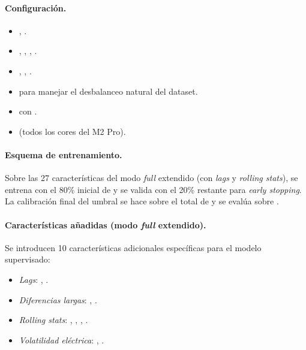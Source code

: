 \paragraph{Configuración.}
\begin{itemize}[leftmargin=*,topsep=0pt]
  \item {}, .
  \item {}, , , .
  \item {}, , .
  \item {} para manejar el desbalanceo natural del dataset.
  \item {} con .
  \item {} (todos los cores del M2 Pro).
\end{itemize}

\paragraph{Esquema de entrenamiento.} Sobre las 27 características del modo \emph{full} extendido (con \emph{lags} y \emph{rolling stats}), se entrena con el 80\% inicial de  y se valida con el 20\% restante para \emph{early stopping}. La calibración final del umbral se hace sobre el total de  y se evalúa sobre .

\paragraph{Características añadidas (modo \emph{full} extendido).} Se introducen 10 características adicionales específicas para el modelo supervisado:
\begin{itemize}[leftmargin=*,topsep=0pt]
  \item \emph{Lags}: , .
  \item \emph{Diferencias largas}: , .
  \item \emph{Rolling stats}: , , , .
  \item \emph{Volatilidad eléctrica}: , .
\end{itemize}

